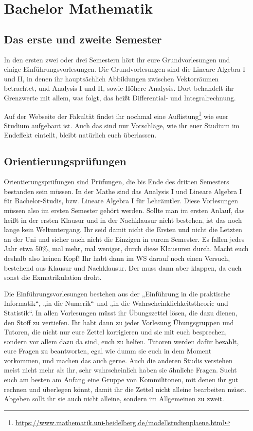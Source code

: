 \section{Bachelor Mathematik}


\subsection{Das erste und zweite Semester}

In den ersten zwei oder drei Semestern hört ihr eure Grundvorlesungen und einige Einführungsvorlesungen. Die Grundvorlesungen sind die Lineare Algebra I und II, in denen ihr hauptsächlich Abbildungen zwischen Vektorräumen betrachtet, und Analysis I und II, sowie Höhere Analysis. Dort behandelt ihr Grenzwerte mit allem, was folgt, das heißt Differential- und Integralrechnung.

Auf der Webseite der Fakultät findet ihr nochmal eine Auflistung\footnote{\url{https://www.mathematik.uni-heidelberg.de/modellstudienplaene.html}} wie euer Studium aufgebaut ist. Auch das sind nur Vorschläge, wie ihr euer Studium im Endeffekt einteilt, bleibt natürlich euch überlassen.

\subsection{Orientierungsprüfungen}

Orientierungsprüfungen sind Prüfungen, die bis Ende des dritten Semesters bestanden sein müssen. In der Mathe sind das Analysis I und Lineare Algebra I für Bachelor-Studis, bzw. Lineare Algebra I für Lehrämtler.  Diese Vorlesungen müssen also im ersten Semester gehört werden.  Sollte man im ersten Anlauf, das heißt in der ersten Klausur und in der Nachklausur nicht bestehen, ist das noch lange kein Weltuntergang. Ihr seid damit nicht die Ersten und nicht die Letzten an der Uni und sicher auch nicht die Einzigen in eurem Semester.  Es fallen jedes Jahr etwa 50\%, mal mehr, mal weniger, durch diese Klausuren durch. Macht euch deshalb also keinen Kopf! Ihr habt dann im WS darauf noch einen Versuch, bestehend aus Klausur und Nachklausur. Der muss dann aber klappen, da euch sonst die Exmatrikulation droht.

Die Einführungsvorlesungen bestehen aus der „Einführung in die praktische Informatik“, „in die Numerik“ und „in die Wahrscheinklichkeitstheorie und Statistik“.  In allen Vorlesungen müsst ihr Übungszettel lösen, die dazu dienen, den Stoff zu vertiefen.  Ihr habt dann zu jeder Vorlesung Übungsgruppen und Tutoren, die nicht nur eure Zettel korrigieren und sie mit euch besprechen, sondern vor allem dazu da sind, euch zu helfen.  Tutoren werden dafür bezahlt, eure Fragen zu beantworten, egal wie dumm sie euch in dem Moment vorkommen, und machen das auch gerne.  Auch die anderen Studis verstehen meist nicht mehr als ihr, sehr wahrscheinlich haben sie ähnliche Fragen.  Sucht euch am besten am Anfang eine Gruppe von Kommilitonen, mit denen ihr gut rechnen und überlegen könnt, damit ihr die Zettel nicht alleine bearbeiten müsst. Abgeben sollt ihr sie auch nicht alleine, sondern im Allgemeinen zu zweit.

